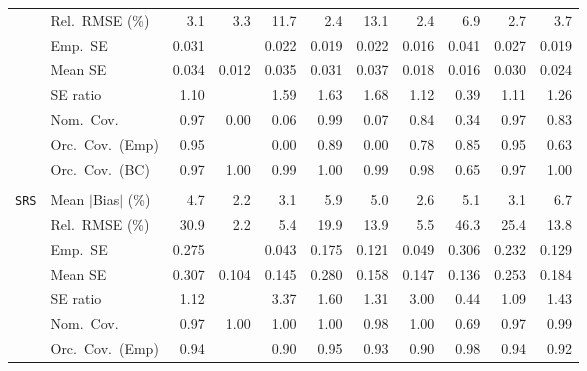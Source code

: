 \begin{landscape}
\begin{longtable}{llrrrrrrrrr}
 & Rel.\ RMSE (\%) & \cellcolor{rankthree}3.1 & 3.3 & 11.7 & \cellcolor{rankone}2.4 & 13.1 & \cellcolor{rankone}2.4 & 6.9 & \cellcolor{ranktwo}2.7 & 3.7 \\
 & Emp.\ SE & 0.031 &  & 0.022 & 0.019 & 0.022 & 0.016 & 0.041 & 0.027 & 0.019 \\
 & Mean SE & 0.034 & 0.012 & 0.035 & 0.031 & 0.037 & 0.018 & 0.016 & 0.030 & 0.024 \\
 & SE ratio & \cellcolor{rankone}1.10 &  & 1.59 & 1.63 & 1.68 & \cellcolor{rankthree}1.12 & 0.39 & \cellcolor{ranktwo}1.11 & 1.26 \\
 & Nom.\ Cov. & \cellcolor{rankone}0.97 & 0.00 & 0.06 & \cellcolor{ranktwo}0.99 & 0.07 & \cellcolor{rankthree}0.84 & 0.34 & \cellcolor{rankone}0.97 & 0.83 \\
 & Orc.\ Cov.\ (Emp) & \cellcolor{rankone}0.95 &  & 0.00 & \cellcolor{ranktwo}0.89 & 0.00 & 0.78 & \cellcolor{rankthree}0.85 & \cellcolor{rankone}0.95 & 0.63 \\
 & Orc.\ Cov.\ (BC) & \cellcolor{rankone}0.97 & 1.00 & \cellcolor{rankthree}0.99 & 1.00 & \cellcolor{rankthree}0.99 & \cellcolor{ranktwo}0.98 & 0.65 & \cellcolor{rankone}0.97 & 1.00 \\
\addlinespace[2pt]
\multicolumn{11}{l}{\textbf{Binary \& Categorical Phase-One Covariates}} \\
\addlinespace[2pt]
\quad \texttt{SRS} & Mean $|$Bias$|$ (\%) & 4.7 & \cellcolor{rankone}2.2 & \cellcolor{rankthree}3.1 & 5.9 & 5.0 & \cellcolor{ranktwo}2.6 & 5.1 & \cellcolor{rankthree}3.1 & 6.7 \\
 & Rel.\ RMSE (\%) & 30.9 & \cellcolor{rankone}2.2 & \cellcolor{ranktwo}5.4 & 19.9 & 13.9 & \cellcolor{rankthree}5.5 & 46.3 & 25.4 & 13.8 \\
 & Emp.\ SE & 0.275 &  & 0.043 & 0.175 & 0.121 & 0.049 & 0.306 & 0.232 & 0.129 \\
 & Mean SE & 0.307 & 0.104 & 0.145 & 0.280 & 0.158 & 0.147 & 0.136 & 0.253 & 0.184 \\
 & SE ratio & \cellcolor{ranktwo}1.12 &  & 3.37 & 1.60 & \cellcolor{rankthree}1.31 & 3.00 & 0.44 & \cellcolor{rankone}1.09 & 1.43 \\
 & Nom.\ Cov. & \cellcolor{rankone}0.97 & 1.00 & 1.00 & 1.00 & \cellcolor{ranktwo}0.98 & 1.00 & 0.69 & \cellcolor{rankone}0.97 & \cellcolor{rankthree}0.99 \\
 & Orc.\ Cov.\ (Emp) & \cellcolor{ranktwo}0.94 &  & 0.90 & \cellcolor{rankone}0.95 & \cellcolor{rankthree}0.93 & 0.90 & 0.98 & \cellcolor{ranktwo}0.94 & 0.92 \\

\end{longtable}
\end{landscape}
